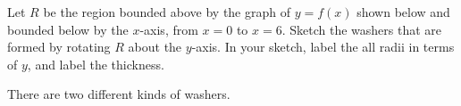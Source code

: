 \begin{question}
Let $R$ be the region bounded above by the graph of $y=f(x)$ shown below and bounded below by the $x$-axis, from $x=0$ to $x=6$. Sketch the washers that are formed by rotating $R$ about the $y$-axis.
In your sketch, label the all radii in terms of $y$, and label the thickness.
\begin{center}
\end{center}

\end{question}
\begin{hint}
There are two different kinds of washers.
\end{hint}
